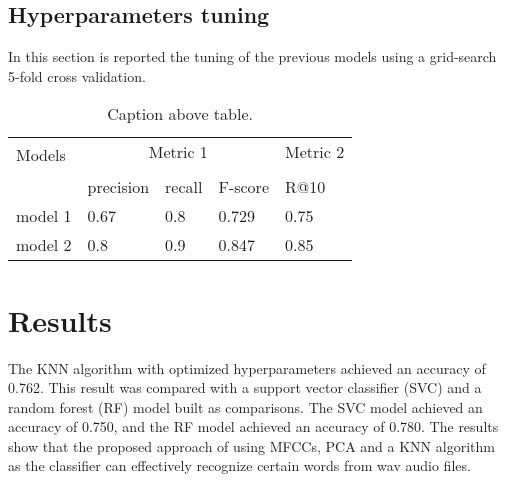 \documentclass[conference]{IEEEtran}
\begin{document}
\subsection{Hyperparameters tuning}
In this section is reported the tuning of the previous models using a grid-search 5-fold cross validation.

\begin{table}[h]
    \centering
    \caption{Caption above table.}
    \begin{tabular}{lllll}
        \toprule
        \multirow{2}{*}[-1em]{Models} & \multicolumn{3}{c}{Metric 1} & Metric 2\\
        \addlinespace[10pt]
        \cmidrule(lr){2-4} \cmidrule(lr){5-5} \\
        {} & precision & recall & F-score  & R@10 \\
        \midrule
        model 1 & 0.67  & 0.8 & 0.729  & 0.75 \\
        model 2 & 0.8 & 0.9 & 0.847 & 0.85 \\
        \bottomrule
    \end{tabular}
    \label{tab:grid}
\end{table}


\section{Results}
The KNN algorithm with optimized hyperparameters achieved an accuracy of 0.762.
This result was compared with a support vector classifier (SVC) and a random forest (RF) model built as comparisons.
The SVC model achieved an accuracy of 0.750, and the RF model achieved an accuracy of 0.780.
The results show that the proposed approach of using MFCCs, PCA and a KNN algorithm as the classifier can effectively recognize certain words from wav audio files.
\end{document}

